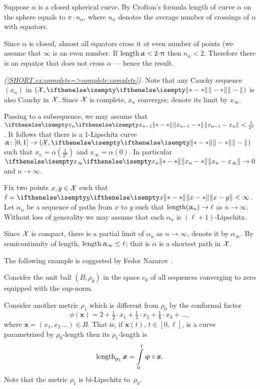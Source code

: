 Suppose $\alpha$ is a closed spherical curve. 
By Crofton's formula length of curve $\alpha$ on the sphere equals to $\pi\cdot n_\alpha$, where $n_\alpha$ denotes the average number of crossings of $\alpha$ with equators.

Since $\alpha$ is closed, almost all equators cross it at even number of points (we assume that $\infty$ is an even number.
If $\length \alpha<2\cdot\pi$ then $n_\alpha<2$.
Therefore there is an equator that does not cross $\alpha$ --- hence the result.


\textit{(\ref{SHORT.ex:complete=>complete:complete}).}
Note that any Cauchy sequence $(x_n)$ in $(\spc{X},\yetdist{}{}{})$ is also Cauchy in $\mathcal{X}$.
Since $\mathcal{X}$ is complete, $x_n$ converges; denote its limit by $x_\infty$.

Passing to a subsequence, we may assume that $\yetdist{x_{n-1}}{x_n}{}<\tfrac1{2^n}$.
It follows that there is a 1-Lipschitz curve $\alpha\:[0,1]\to (\spc{X},\yetdist{}{}{})$ such that $x_n=\alpha(\tfrac1{2^n})$ and $x_\infty=\alpha(0)$.
In particular $\yetdist{x_n}{x_\infty}{}\to0$ and $n\to\infty$.

Fix two points $x,y\in\spc{X}$ such that $\ell=\yetdist{x}{y}{}<\infty$.
Let $\alpha_n$ be a sequence of paths from $x$ to $y$ such that $\length(\alpha_n)\to\ell$ as $n\to \infty$.
Without loss of generality we may assume that each $\alpha_n$ is $(\ell+1)$-Lipschitz.

Since $\mathcal{X}$ is compact, there is a partial limit of $\alpha_n$ as $n\to \infty$,
denote it by $\alpha_\infty$.
By semicontinuity of length, $\length\alpha_\infty\le\ell$;
that is $\alpha$ is a shortest path in $\mathcal{X}$.

The following example is suggested by Fedor Nazarov \cite{nazarov}.

\medskip

Consider the unit ball $(B,\rho_0)$
in the space $c_0$ of all sequences converging to zero equipped with the sup-norm.

Consider another metric $\rho_1$ which is different from $\rho_0$ by the conformal factor
\[\phi(\bm{x})=2+\tfrac{1}2\cdot x_1+\tfrac{1}4\cdot x_2+\tfrac{1}8\cdot x_3+\dots,\]
where $\bm{x}=(x_1,x_2\,\dots)\in B$.
That is, if $\bm{x}(t)$, $t\in[0,\ell]$, is a curve parametrized by $\rho_0$-length 
then its $\rho_1$-length is 
\[\length_{\rho_1}\bm{x}=\int\limits_0^\ell\phi\circ\bm{x}.\]
Note that the metric $\rho_1$ is bi-Lipschitz to~$\rho_0$.

